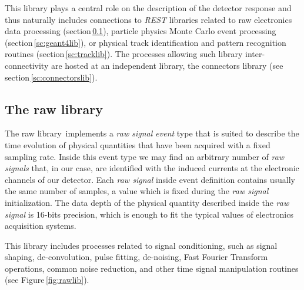 This library plays a central role on the description of the detector response and thus naturally includes connections to \emph{REST} libraries related to raw electronics data processing (section\,\ref{sc:rawlib}), particle physics Monte Carlo event processing (section\,\ref{sc:geant4lib}), or physical track identification and pattern recognition routines (section\,\ref{sc:tracklib}). The processes allowing such library inter-connectivity are hosted at an independent library, the connectors library (see section\,\ref{sc:connectorslib}).

\subsection{The raw library}\label{sc:rawlib}

The raw library\,\cite{REST_Raw_Git} implements a \emph{raw signal event} type that is suited to describe the time evolution of physical quantities that have been acquired with a fixed sampling rate. Inside this event type we may find an arbitrary number of \emph{raw signals} that, in our case, are identified with the induced currents at the electronic channels of our detector. Each \emph{raw signal} inside event definition contains usually the same number of samples, a value which is fixed during the \emph{raw signal} initialization. The data depth of the physical quantity described inside the \emph{raw signal} is 16-bits precision, which is enough to fit the typical values of electronics acquisition systems.

This library includes processes related to signal conditioning, such as signal shaping, de-convolution, pulse fitting, de-noising, Fast Fourier Transform operations, common noise reduction, and other time signal manipulation routines (see Figure\,\ref{fig:rawlib}). 

